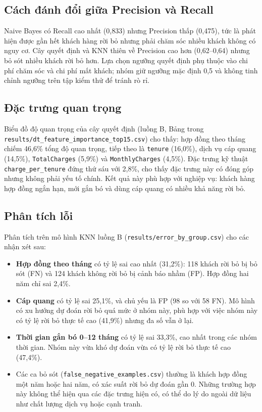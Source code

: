 \subsection{Cách đánh đổi giữa Precision và Recall}
Naive Bayes có Recall cao nhất (0,833) nhưng Precision thấp (0,475), tức là phát hiện được gần hết khách hàng rời bỏ nhưng phải chăm sóc nhiều khách không có nguy cơ.
Cây quyết định và KNN thiên về Precision cao hơn (0,62--0,64) nhưng bỏ sót nhiều khách rời bỏ hơn. Lựa chọn ngưỡng quyết định phụ thuộc vào chi phí chăm sóc và chi phí mất khách; nhóm giữ ngưỡng mặc định 0,5 và không tinh chỉnh ngưỡng trên tập kiểm thử để tránh rò rỉ.

\subsection{Đặc trưng quan trọng}
Biểu đồ độ quan trọng của cây quyết định (luồng B, Bảng trong \texttt{results/dt\_feature\_importance\_top15.csv}) cho thấy:
hợp đồng theo tháng chiếm 46,6\% tổng độ quan trọng, tiếp theo là \texttt{tenure} (16,0\%), dịch vụ cáp quang (14,5\%), \texttt{TotalCharges} (5,9\%) và \texttt{MonthlyCharges} (4,5\%).
Đặc trưng kỹ thuật \texttt{charge\_per\_tenure} đứng thứ sáu với 2,8\%, cho thấy đặc trưng này có đóng góp nhưng không phải yếu tố chính.
Kết quả này phù hợp với nghiệp vụ: khách hàng hợp đồng ngắn hạn, mới gắn bó và dùng cáp quang có nhiều khả năng rời bỏ.

\subsection{Phân tích lỗi}
Phân tích trên mô hình KNN luồng B (\texttt{results/error\_by\_group.csv}) cho các nhận xét sau:
\begin{itemize}
    \item \textbf{Hợp đồng theo tháng} có tỷ lệ sai cao nhất (31,2\%): 118 khách rời bỏ bị bỏ sót (FN) và 124 khách không rời bỏ bị cảnh báo nhầm (FP). Hợp đồng hai năm chỉ sai 2,4\%.
    \item \textbf{Cáp quang} có tỷ lệ sai 25,1\%, và chủ yếu là FP (98 so với 58 FN). Mô hình có xu hướng dự đoán rời bỏ quá mức ở nhóm này, phù hợp với việc nhóm này có tỷ lệ rời bỏ thực tế cao (41,9\%) nhưng đa số vẫn ở lại.
    \item \textbf{Thời gian gắn bó 0--12 tháng} có tỷ lệ sai 33,3\%, cao nhất trong các nhóm thời gian. Nhóm này vừa khó dự đoán vừa có tỷ lệ rời bỏ thực tế cao (47,4\%).
    \item Các ca bỏ sót (\texttt{false\_negative\_examples.csv}) thường là khách hợp đồng một năm hoặc hai năm, có xác suất rời bỏ dự đoán gần 0. Những trường hợp này không thể hiện qua các đặc trưng hiện có, có thể do lý do ngoài dữ liệu như chất lượng dịch vụ hoặc cạnh tranh.
\end{itemize}

